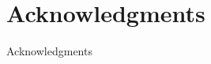\documentclass[t,handout,9pt]{beamer}
\begin{document}
\section{Acknowledgments}
\begin{frame}{Acknowledgments}
\end{frame}
%

\end{document}
